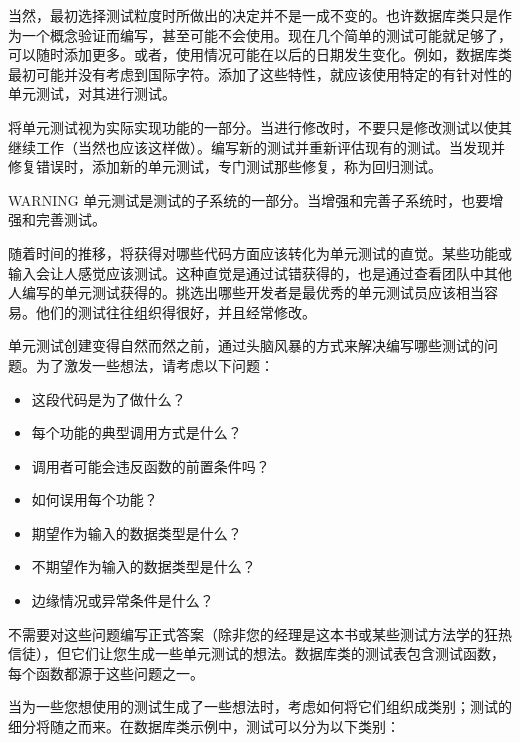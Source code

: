 当然，最初选择测试粒度时所做出的决定并不是一成不变的。也许数据库类只是作为一个概念验证而编写，甚至可能不会使用。现在几个简单的测试可能就足够了，可以随时添加更多。或者，使用情况可能在以后的日期发生变化。例如，数据库类最初可能并没有考虑到国际字符。添加了这些特性，就应该使用特定的有针对性的单元测试，对其进行测试。

将单元测试视为实际实现功能的一部分。当进行修改时，不要只是修改测试以使其继续工作（当然也应该这样做）。编写新的测试并重新评估现有的测试。当发现并修复错误时，添加新的单元测试，专门测试那些修复，称为回归测试。

\begin{myWarning}{WARNING}
单元测试是测试的子系统的一部分。当增强和完善子系统时，也要增强和完善测试。
\end{myWarning}


随着时间的推移，将获得对哪些代码方面应该转化为单元测试的直觉。某些功能或输入会让人感觉应该测试。这种直觉是通过试错获得的，也是通过查看团队中其他人编写的单元测试获得的。挑选出哪些开发者是最优秀的单元测试员应该相当容易。他们的测试往往组织得很好，并且经常修改。

单元测试创建变得自然而然之前，通过头脑风暴的方式来解决编写哪些测试的问题。为了激发一些想法，请考虑以下问题：

\begin{itemize}
\item
这段代码是为了做什么？

\item
每个功能的典型调用方式是什么？

\item
调用者可能会违反函数的前置条件吗？

\item
如何误用每个功能？

\item
期望作为输入的数据类型是什么？

\item
不期望作为输入的数据类型是什么？

\item
边缘情况或异常条件是什么？
\end{itemize}

不需要对这些问题编写正式答案（除非您的经理是这本书或某些测试方法学的狂热信徒），但它们让您生成一些单元测试的想法。数据库类的测试表包含测试函数，每个函数都源于这些问题之一。

当为一些您想使用的测试生成了一些想法时，考虑如何将它们组织成类别；测试的细分将随之而来。在数据库类示例中，测试可以分为以下类别：


